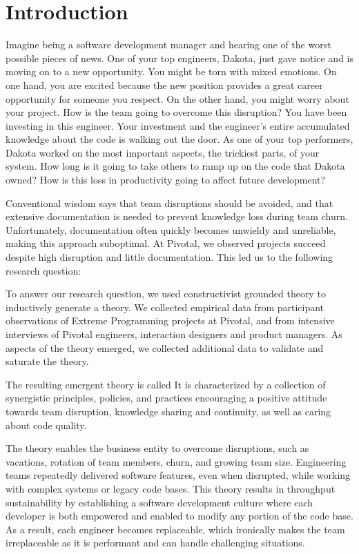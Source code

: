 
\section{Introduction}

Imagine being a software development manager and hearing one of the worst possible pieces of news.  One of your top engineers, Dakota, just gave notice and is moving on to a new opportunity. You might be torn with mixed emotions. On one hand, you are excited because the new position provides a great career opportunity for someone you respect. On the other hand, you might worry about your project. How is the team going to overcome this disruption? You have been investing in this engineer. Your investment and the engineer's entire accumulated knowledge about the code is walking out the door.  As one of your top performers, Dakota worked on the most important aspects, the trickiest parts, of your system. How long is it going to take others to ramp up on the code that Dakota owned? How is this loss in productivity going to affect future development? 

Conventional wisdom says that team disruptions should be avoided, and that extensive documentation is needed to prevent knowledge loss during team churn. Unfortunately, documentation often quickly becomes unwieldy and unreliable, making this approach suboptimal. At Pivotal, we observed projects succeed despite high disruption and little documentation. This led us to the following research question: 

To answer our research question, we used constructivist grounded theory to inductively generate a theory. We collected empirical data from participant observations of Extreme Programming projects at Pivotal, and from intensive interviews of Pivotal engineers, interaction designers and product managers. As aspects of the theory emerged, we collected additional data to validate and saturate the theory.

The resulting emergent theory is called  It is characterized by a collection of synergistic principles, policies, and practices encouraging a positive attitude towards team disruption, knowledge sharing and continuity, as well as caring about code quality. 

The theory enables the business entity to overcome disruptions, such as vacations, rotation of team members, churn, and growing team size. Engineering teams repeatedly delivered software features, even when disrupted, while working with complex systems or legacy code bases. This theory results in throughput sustainability by establishing a software development culture where each developer is both empowered and enabled to modify any portion of the code base. As a result, each engineer becomes replaceable, which ironically makes the team irreplaceable as it is performant and can handle challenging situations. 

